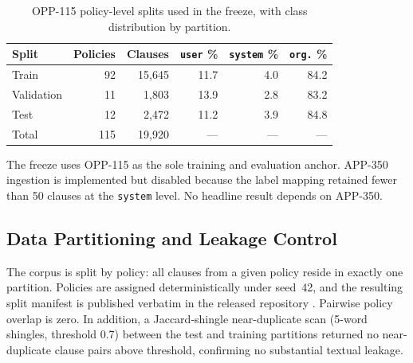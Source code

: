 \documentclass[final,3p,times,twocolumn]{elsarticle}
\begin{document}
	\begin{table}[h]
		\centering
		\caption{OPP-115 policy-level splits used in the freeze, with class distribution
		by partition.}
		\label{tab:splits}
        
        \footnotesize
		\setlength{\tabcolsep}{3pt}
		\begin{tabular}{@{}l r r r r r@{}}
			\toprule \textbf{Split} & \textbf{Policies} & \textbf{Clauses} & \texttt{user} \% & \texttt{system} \% & \texttt{org.} \% \\
			\midrule Train          & 92                & 15,645& 11.7             & 4.0                & 84.2             \\
			Validation              & 11                & 1,803& 13.9             & 2.8                & 83.2             \\
			Test                    & 12                & 2,472& 11.2& 3.9& 84.8\\
			\midrule Total          & 115               & 19,920& ---& ---& ---\\
			\bottomrule
		\end{tabular}
	\end{table}

	The freeze uses OPP-115 as the sole training and evaluation anchor. APP-350
	ingestion is implemented but disabled because the label mapping retained fewer
	than 50 clauses at the \texttt{system} level. No headline result depends on
	APP-350.

	\subsection{Data Partitioning and Leakage Control}
	The corpus is split by policy: all clauses from a given policy reside in
	exactly one partition. Policies are assigned deterministically under seed~42,
	and the resulting split manifest is published verbatim in the released
	repository \citep{prertcnm_github}. Pairwise policy overlap is zero. In addition,
	a Jaccard-shingle near-duplicate scan (5-word shingles, threshold 0.7) between
	the test and training partitions returned no near-duplicate clause pairs above
	threshold, confirming no substantial textual leakage.
\end{document}
